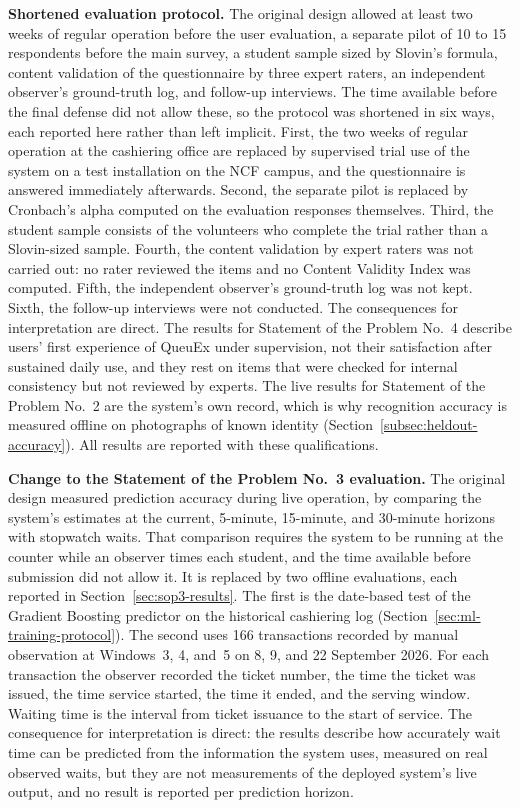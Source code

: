 \documentclass{research}
\newcommand{\sysname}{QueuEx}
\begin{document}
\textbf{Shortened evaluation protocol.} The original design allowed at
least two weeks of regular operation before the user evaluation, a
separate pilot of 10 to 15 respondents before the main survey, a
student sample sized by Slovin's formula, content validation of the
questionnaire by three expert raters, an independent observer's
ground-truth log, and follow-up interviews. The time available before
the final defense did not allow these, so the protocol was shortened in
six ways, each reported here rather than left implicit. First, the two
weeks of regular operation at the cashiering office are replaced by
supervised trial use of the system on a test installation on the NCF
campus, and the
questionnaire is answered immediately afterwards.
Second, the separate pilot is replaced by Cronbach's alpha computed on
the evaluation responses themselves. Third, the student sample consists
of the volunteers who complete the trial rather than a Slovin-sized
sample. Fourth, the content validation by expert raters was not carried
out: no rater reviewed the items and no Content Validity Index was
computed. Fifth, the independent observer's ground-truth log was not
kept. Sixth, the follow-up interviews were not conducted. The
consequences for interpretation are direct. The results for Statement
of the Problem No.~4 describe users' first experience of \sysname{}
under supervision, not their satisfaction after sustained daily use,
and they rest on items that were checked for internal consistency but
not reviewed by experts. The live results for Statement of the Problem
No.~2 are the system's own record, which is why recognition accuracy is
measured offline on photographs of known identity
(Section~\ref{subsec:heldout-accuracy}). All results are reported with
these qualifications.

\textbf{Change to the Statement of the Problem No.~3 evaluation.} The
original design measured prediction accuracy during live operation, by
comparing the system's estimates at the current, 5-minute, 15-minute,
and 30-minute horizons with stopwatch waits. That comparison requires
the system to be running at the counter while an observer times each
student, and the time available before submission did not allow it. It
is replaced by two offline evaluations, each reported in
Section~\ref{sec:sop3-results}. The first is the date-based test of the
Gradient Boosting predictor on the historical cashiering log
(Section~\ref{sec:ml-training-protocol}). The second uses 166
transactions recorded by manual observation at Windows~3, 4, and~5 on
8, 9, and 22 September 2026. For each transaction the observer recorded
the ticket number, the time the ticket was issued, the time service
started, the time it ended, and the serving window. Waiting time is the
interval from ticket issuance to the start of service. The consequence
for interpretation is direct: the results describe how accurately wait
time can be predicted from the information the system uses, measured on
real observed waits, but they are not measurements of the deployed
system's live output, and no result is reported per prediction horizon.
\end{document}
